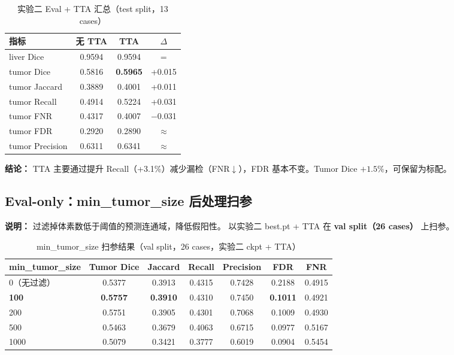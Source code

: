 \documentclass{article}
\begin{document}
	\begin{table}[H]
		\centering
		\caption{实验二 Eval + TTA 汇总（test split，13 cases）}
		\begin{tabular}{lccc}
			\hline
			\textbf{指标} & \textbf{无 TTA} & \textbf{TTA} & \textbf{$\Delta$} \\
			\hline
			liver Dice      & 0.9594 & 0.9594          & = \\
			tumor Dice      & 0.5816 & \textbf{0.5965} & +0.015 \\
			tumor Jaccard   & 0.3889 & 0.4001          & +0.011 \\
			tumor Recall    & 0.4914 & 0.5224          & +0.031 \\
			tumor FNR       & 0.4317 & 0.4007          & $-$0.031 \\
			tumor FDR       & 0.2920 & 0.2890          & $\approx$ \\
			tumor Precision & 0.6311 & 0.6341          & $\approx$ \\
			\hline
		\end{tabular}
	\end{table}

	\noindent\textbf{结论：} TTA 主要通过提升 Recall（+3.1\%）减少漏检（FNR$\downarrow$），FDR 基本不变。Tumor Dice $+1.5\%$，可保留为标配。

	\subsection{Eval-only：min\_tumor\_size 后处理扫参}

	\noindent\textbf{说明：} 过滤掉体素数低于阈值的预测连通域，降低假阳性。
	以实验二 best.pt + TTA 在 \textbf{val split（26 cases）} 上扫参。

	\begin{table}[H]
		\centering
		\caption{min\_tumor\_size 扫参结果（val split，26 cases，实验二 ckpt + TTA）}
		\begin{tabular}{lcccccc}
			\hline
			\textbf{min\_tumor\_size} & \textbf{Tumor Dice} & \textbf{Jaccard} & \textbf{Recall} & \textbf{Precision} & \textbf{FDR} & \textbf{FNR} \\
			\hline
			0（无过滤）  & 0.5377 & 0.3913 & 0.4315 & 0.7428 & 0.2188 & 0.4915 \\
			\textbf{100} & \textbf{0.5757} & \textbf{0.3910} & 0.4310 & 0.7450 & \textbf{0.1011} & 0.4921 \\
			200          & 0.5751 & 0.3905 & 0.4301 & 0.7068 & 0.1009 & 0.4930 \\
			500          & 0.5463 & 0.3679 & 0.4063 & 0.6715 & 0.0977 & 0.5167 \\
			1000         & 0.5079 & 0.3421 & 0.3777 & 0.6019 & 0.0904 & 0.5454 \\
			\hline
		\end{tabular}
	\end{table}
\end{document}
